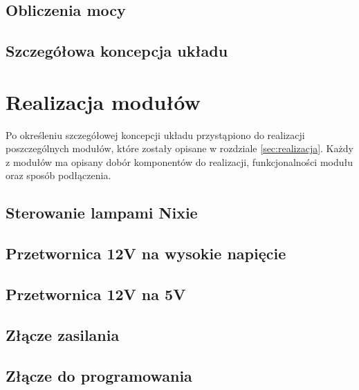 \documentclass[twoside]{article}
\numberwithin{equation}{section}
\begin{document}
\subsection{Obliczenia mocy}
\label{sec:obliczenia_mocy}

\newpage

\subsection{Szczegółowa koncepcja układu}

\newpage



\section{Realizacja modułów}
Po określeniu szczegółowej koncepcji układu przystąpiono do realizacji poszczególnych modułów, które zostały opisane w rozdziale \ref{sec:realizacja}.
Każdy z modułów ma opisany dobór komponentów do realizacji, funkcjonalności modułu oraz sposób podłączenia.

\subsection{Sterowanie lampami Nixie}

\newpage

\subsection{Przetwornica 12V na wysokie napięcie}

\newpage

\subsection{Przetwornica 12V na 5V}

\newpage 

\subsection{Złącze zasilania}

\newpage

\subsection{Złącze do programowania}
\label{sec:usb_c_to_program}

\newpage
\end{document}
